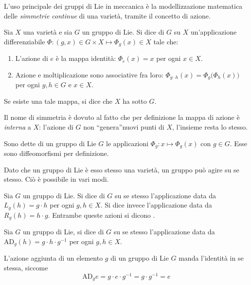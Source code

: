 L'uso principale dei gruppi di Lie in meccanica è la modellizzazione matematica delle \emph{simmetrie continue} di una varietà, tramite il concetto di azione.
\begin{definition}
  Sia $X$ una varietà e sia $G$ un gruppo di Lie. Si dice  di $G$ su $X$ un'applicazione differenziabile $\Phi:(g,x) \in G \times X \mapsto \Phi_g(x) \in X$ tale che:
  \begin{enumerate}
    \item L'azione di $e$ è la mappa identità: $\Phi_e (x) = x$ per ogni $x \in X$.
    \item Azione e moltiplicazione sono associative fra loro: $\Phi_{g\cdot h} (x) = \Phi_g \big(\Phi_h (x)\big)$ per ogni $g,h \in G$ e $x \in X$.
  \end{enumerate}
Se esiste una tale mappa, si dice che $X$ ha  sotto $G$. 
\end{definition}
\begin{remark}
  Il nome di simmetria è dovuto al fatto che per definizione la mappa di azione è \emph{interna} a $X$: l'azione di $G$ non \textquotedblleft genera\textquotedblright nuovi punti di $X$, l'insieme resta lo stesso.
\end{remark}
\begin{remark}
  Sono dette  di un gruppo di Lie $G$ le applicazioni $\Phi_g: x \mapsto \Phi_g(x)$ con $g \in G$. Esse sono diffeomorfismi per definizione.
\end{remark}

Dato che un gruppo di Lie è esso stesso una varietà, un gruppo può agire su se stesso. Ciò è possibile in vari modi.

\begin{definition}
  Sia $G$ un gruppo di Lie. Si dice  di $G$ su se stesso l'applicazione data da $L_g(h) = g \cdot h$ per ogni $g,h \in X$. Si dice invece  l'applicazione data da $R_g(h) = h \cdot g$. Entrambe queste azioni si dicono .
\end{definition}
\begin{definition}
  Sia $G$ un gruppo di Lie, si dice  di $G$ su se stesso l'applicazione data da $\mathrm{AD}_g(h) = g \cdot h \cdot g^{-1}$ per ogni $g,h \in X$.
\end{definition}
\begin{remark} \label{rem:adjIdentity}
  L'azione aggiunta di un elemento $g$ di un gruppo di Lie $G$ manda l'identità in se stessa, siccome \begin{equation*}
    \mathrm{AD}_g e = g\cdot e\cdot g^{-1} = g\cdot g^{-1} = e
  \end{equation*} 
\end{remark}

